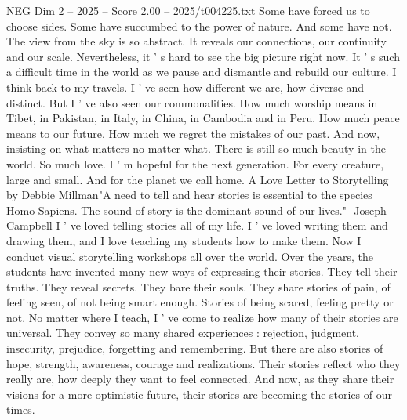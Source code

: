 \begin{textsample}{NEG Dim 2 – 2025 – Score 2.00 – 2025/t004225.txt}
Some have forced us to choose sides.
Some have succumbed to the power of nature.
And some have not.
The view from the sky is so abstract.
It reveals our connections, our continuity and our scale.
Nevertheless, it ' s hard to see the big picture right now.
It ' s such a difficult time in the world as we pause and dismantle and rebuild our culture.
I think back to my travels.
I ' ve seen how different we are, how diverse and distinct.
But I ' ve also seen our commonalities.
How much worship means in Tibet, in Pakistan, in Italy, in China, in Cambodia and in Peru.
How much peace means to our future.
How much we regret the mistakes of our past.
And now, insisting on what matters no matter what.
There is still so much beauty in the world.
So much love.
I ' m hopeful for the next generation.
For every creature, large and small.
And for the planet we call home.
A Love Letter to Storytelling by Debbie Millman"A need to tell and hear stories is essential to the species Homo Sapiens.
The sound of story is the dominant sound of our lives."- Joseph Campbell I ' ve loved telling stories all of my life.
I ' ve loved writing them and drawing them, and I love teaching my students how to make them.
Now I conduct visual storytelling workshops all over the world.
Over the years, the students have invented many new ways of expressing their stories.
They tell their truths.
They reveal secrets.
They bare their souls.
They share stories of pain, of feeling seen, of not being smart enough.
Stories of being scared, feeling pretty or not.
No matter where I teach, I ' ve come to realize how many of their stories are universal.
They convey so many shared experiences : rejection, judgment, insecurity, prejudice, forgetting and remembering.
But there are also stories of hope, strength, awareness, courage and realizations.
Their stories reflect who they really are, how deeply they want to feel connected.
And now, as they share their visions for a more optimistic future, their stories are becoming the stories of our times.

\end{textsample}

